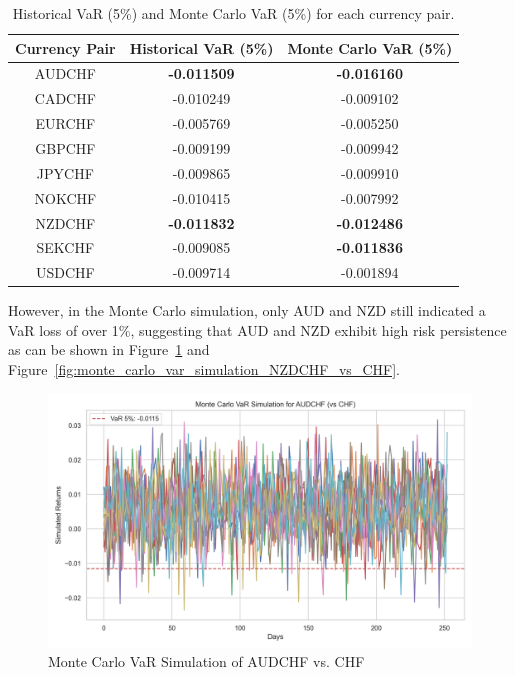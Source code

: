 \documentclass{article}
\begin{document}
\begin{table}[!ht]
    \centering
    \begin{tabular}{|c|c|c|}
    \hline
        Currency Pair & Historical VaR (5\%) & Monte Carlo VaR (5\%) \\ \hline
        AUDCHF & \textbf{-0.011509} & \textbf{-0.016160} \\ \hline
        CADCHF & -0.010249 & -0.009102 \\ \hline
        EURCHF & -0.005769 & -0.005250 \\ \hline
        GBPCHF & -0.009199 & -0.009942 \\ \hline
        JPYCHF & -0.009865 & -0.009910 \\ \hline
        NOKCHF & -0.010415 & -0.007992 \\ \hline
        NZDCHF & \textbf{-0.011832} & \textbf{-0.012486} \\ \hline
        SEKCHF & -0.009085 & \textbf{-0.011836} \\ \hline
        USDCHF & -0.009714 & -0.001894 \\ \hline
    \end{tabular}
    \label{table:var}
    \caption{Historical VaR (5\%) and Monte Carlo VaR (5\%) for each currency pair.}
\end{table}

However, in the Monte Carlo simulation, only AUD and NZD still indicated a VaR loss of over 1\%, suggesting that AUD and NZD exhibit high risk persistence as can be shown in Figure~\ref{fig:monte_carlo_var_simulation_AUDCHF_vs_CHF} and Figure~\ref{fig:monte_carlo_var_simulation_NZDCHF_vs_CHF}.

\begin{figure}[h]
    \centering   
    \includegraphics[width=0.75\linewidth]{reports/figures/monte_carlo_var_simulation_AUDCHF_vs_CHF.png}
    \caption{Monte Carlo VaR Simulation of AUDCHF vs. CHF}  \label{fig:monte_carlo_var_simulation_AUDCHF_vs_CHF}
\end{figure}
\end{document}
